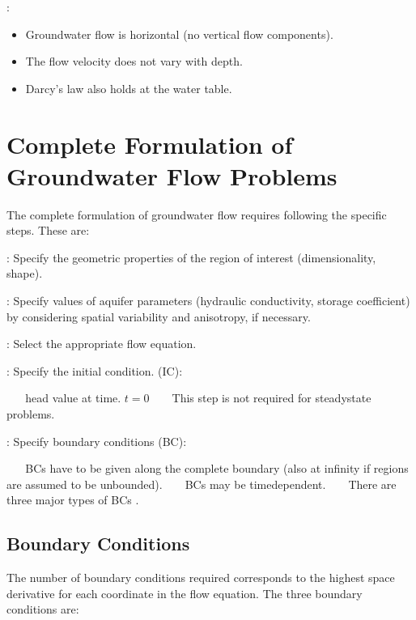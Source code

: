 \documentclass[letterpaper,10pt,english]{jupyterBook}
\begin{document}
\sphinxAtStartPar
{}:
\begin{itemize}
\item {} 
\sphinxAtStartPar
Groundwater flow is horizontal (no vertical flow components).

\item {} 
\sphinxAtStartPar
The flow velocity does not vary with depth.

\item {} 
\sphinxAtStartPar
Darcy’s law also holds at the water table.

\end{itemize}


\section{Complete Formulation of Groundwater Flow Problems}
\label{\detokenize{content/flow/L7/17_quantify_flow:complete-formulation-of-groundwater-flow-problems}}
\sphinxAtStartPar
The complete formulation of groundwater flow requires following the specific steps. These are:

\sphinxAtStartPar
{} : Specify the geometric properties of the region of interest (dimensionality, shape).  

\sphinxAtStartPar
{} : Specify values of aquifer parameters (hydraulic conductivity, storage coefficient) by considering spatial variability and anisotropy, if necessary.  

\sphinxAtStartPar
{} : Select the appropriate flow equation.  

\sphinxAtStartPar
{} : Specify the initial condition. (IC):

\sphinxAtStartPar
     head value at time. \(t=0\) 
     This step is not required for steady\sphinxhyphen{}state problems.  

\sphinxAtStartPar
{} : Specify boundary conditions (BC):

\sphinxAtStartPar
     BCs have to be given along the complete boundary (also at infinity if regions are assumed to be unbounded). 
     BCs may be time\sphinxhyphen{}dependent. 
     There are three major types of BCs . 


\subsection{Boundary Conditions}
\label{\detokenize{content/flow/L7/17_quantify_flow:boundary-conditions}}
\sphinxAtStartPar
The number of boundary conditions required corresponds to the highest space derivative for each coordinate in the flow equation. The three boundary conditions are:
\end{document}
